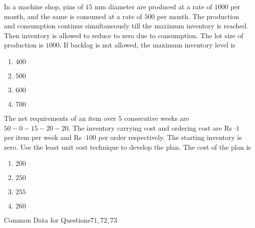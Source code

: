                         \iffalse
                       
                        
                        
                        
                    
                        \author{AI24BTECH11006 - Bugada Roopansha}
                        \section{me}
                        \chapter{2007}
                        \fi
                        \item In a machine shop, pins of $15$ mm diameter are produced at a rate of $1000$ per month, and the same is consumed at a rate of $500$ per month. The production and consumption continue simultaneously till the maximum inventory is reached. Then inventory is allowed to reduce to zero due to consumption. The lot size of production is $1000$. If backlog is not allowed, the maximum inventory level is
                        \begin{enumerate}
                            \item $400$
                            \item $500$
                            \item $600$
                            \item $700$
                        \end{enumerate}
                        \item The net requirements of an item over $5$ consecutive weeks are $50-0-15-20-20$. The inventory carrying cost and ordering cost are Rs $\cdot1$ per item per week and Rs $\cdot100$ per order respectively. The starting inventory is zero. Use the least unit cost technique to develop the plan. The cost of the plan  is
                            \begin{enumerate}
                                \item $200$
                                \item $250$
                                \item $255$
                                \item $260$
                            \end{enumerate}
                        Common Data for Questions$ 71, 72, 73$  
                        
